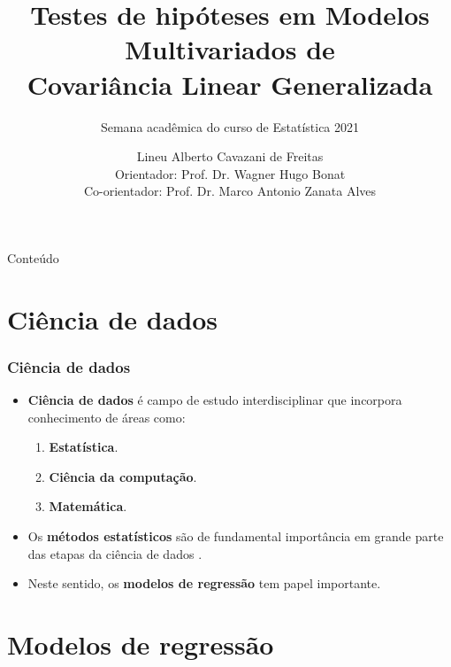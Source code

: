 \documentclass[10pt,
  aspectratio=169,
  serif,
  mathserif,
  professionalfont,
  compress,
  handout,
  ]{beamer}\usepackage[]{graphicx}\usepackage[]{color}
\title[TH MCGLM]{
  \Large Testes de hipóteses em Modelos Multivariados de \\ Covariância Linear Generalizada\\ \vspace{0.3cm}}
\subtitle{Semana acadêmica do curso de Estatística 2021}
\author[Lineu Alberto]{\small
  Lineu Alberto Cavazani de Freitas \\
  Orientador: Prof. Dr. Wagner Hugo Bonat\\
  Co-orientador: Prof. Dr. Marco Antonio Zanata Alves
}
\institute[UFPR]{
    PPG Informática %
% 
 }
\date{}
\begin{document}
\frame{\titlepage}

 \begin{frame}{Conteúdo}
   \small{\tableofcontents}
 \end{frame}





\section{Ciência de dados}


\begin{frame}
  \frametitle{Ciência de dados}
  \begin{itemize}
    \itemsep 2ex
  
  \item \textbf{Ciência de dados} é campo de estudo interdisciplinar que incorpora conhecimento de áreas como:
  
  \begin{enumerate}
    \item \textbf{Estatística}.
    \item \textbf{Ciência da computação}.
    \item \textbf{Matemática}.
  \end{enumerate}

  \item Os \textbf{métodos estatísticos} são de fundamental importância em grande parte das etapas da ciência de dados \cite{weihs2018data}.
  
  \item Neste sentido, os \textbf{modelos de regressão} tem papel importante.
  
  \end{itemize}
\end{frame}


\section{Modelos de regressão}

\end{document}
